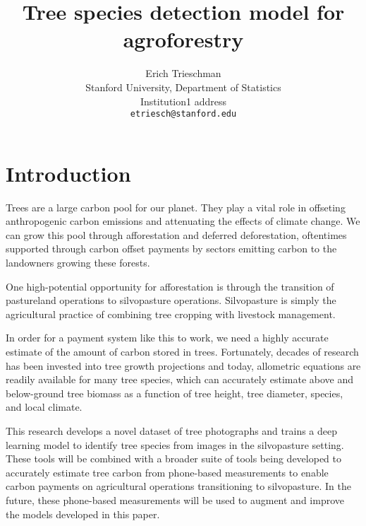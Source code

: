 \documentclass[10pt,twocolumn,letterpaper]{article}
\begin{document}
\title{Tree species detection model for agroforestry}

\author{Erich Trieschman\\
Stanford University, Department of Statistics\\
Institution1 address\\
{\tt\small etriesch@stanford.edu}
}

\maketitle

\section{Introduction}

Trees are a large carbon pool for our planet. They play a vital role in offseting anthropogenic carbon emissions and attenuating the effects of climate change. We can grow this pool through afforestation and deferred deforestation, oftentimes supported through carbon offset payments by sectors emitting carbon to the landowners growing these forests. 

One high-potential opportunity for afforestation is through the transition of pastureland operations to silvopasture operations. Silvopasture is simply the agricultural practice of combining tree cropping with livestock management. 

In order for a payment system like this to work, we need a highly accurate estimate of the amount of carbon stored in trees. Fortunately, decades of research has been invested into tree growth projections and today, allometric equations are readily available for many tree species,  which can accurately estimate above and below-ground tree biomass as a function of tree height, tree diameter, species, and local climate. 

This research develops a novel dataset of tree photographs and trains a deep learning model to identify tree species from images in the silvopasture setting. These tools will be combined with a broader suite of tools being developed to accurately estimate tree carbon from phone-based measurements to enable carbon payments on agricultural operations transitioning to silvopasture. In the future, these phone-based measurements will be used to augment and improve the models developed in this paper.
\end{document}
